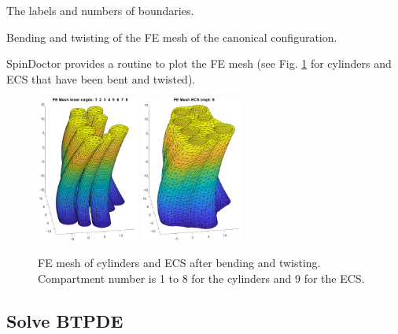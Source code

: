 \documentclass[a4paper]{article}
\begin{document}
\begin{table}
    \centering
    
    \caption{The labels and numbers of boundaries.}
    \label{table:bdys_labels}
\end{table}

\begin{algorithm}
    
    \caption{Bending and twisting of the FE mesh of the canonical configuration.}
    \label{algo:bend_twist}
\end{algorithm}

SpinDoctor provides a routine to plot the FE mesh (see Fig. \ref{fig:plot_fe_mesh} for cylinders and ECS that have been bent and twisted).

\begin{figure}
    \centering
    \includegraphics[width=0.3\textwidth]{plot_femesh/cylinders_cells.png}
    \includegraphics[width=0.3\textwidth]{plot_femesh/cylinders_ecs.png}
    \caption{FE mesh of cylinders and ECS after bending and twisting.
        Compartment number is 1 to 8 for the cylinders and 9 for the ECS.}
    \label{fig:plot_fe_mesh}
\end{figure}



\subsection{Solve BTPDE} \label{sec:solve_btpde}
\end{document}
